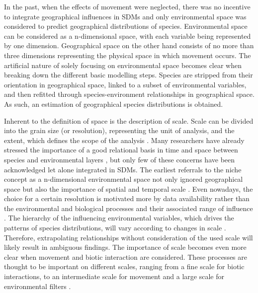 \documentclass[12pt,authoryear]{elsarticle}
\begin{document}
\vspace{5mm}

In the past, when the effects of movement were neglected, there was no incentive to integrate geographical influences in SDMs and only environmental space was considered to predict geographical distributions of species. Environmental space can be considered as a n-dimensional space, with each variable being represented by one dimension. Geographical space on the other hand consists of no more than three dimensions representing the physical space in which movement occurs. The artificial nature of solely focusing on environmental space becomes clear when breaking down the different basic modelling steps. Species are stripped from their orientation in geographical space, linked to a subset of environmental variables, and then refitted through species-environment relationships in geographical space. As such, an estimation of geographical species distributions is obtained. 

Inherent to the definition of space is the description of scale. Scale can be divided into the grain size (or resolution), representing the unit of analysis, and the extent, which defines the scope of the analysis \citep{Song2013}. Many researchers have already stressed the importance of a good relational basis in time and space between species and environmental layers \citep{Fernandez2013,Elith2009}, but only few of these concerns have been acknowledged let alone integrated in SDMs. The earliest referrals to the niche concept as a n-dimensional environmental space not only ignored geographical space but also the importance of spatial and temporal scale \citep{Austin2002}. Even nowadays, the choice for a certain resolution is motivated more by data availability rather than the environmental and biological processes and their associated range of influence \citep{Guisan2005,Yackulic2016,Song2013}. The hierarchy of the influencing environmental variables, which drives the patterns of species distributions, will vary according to changes in scale \citep{Pearson2004,Guisan2005}. Therefore, extrapolating relationships without consideration of the used scale will likely result in ambiguous findings. The importance of scale becomes even more clear when movement and biotic interaction are considered. These processes are thought to be important on different scales, ranging from a fine scale for biotic interactions, to an intermediate scale for movement and a large scale for environmental filters \citep{Thuiller2015,Guisan2005}. 
\end{document}
